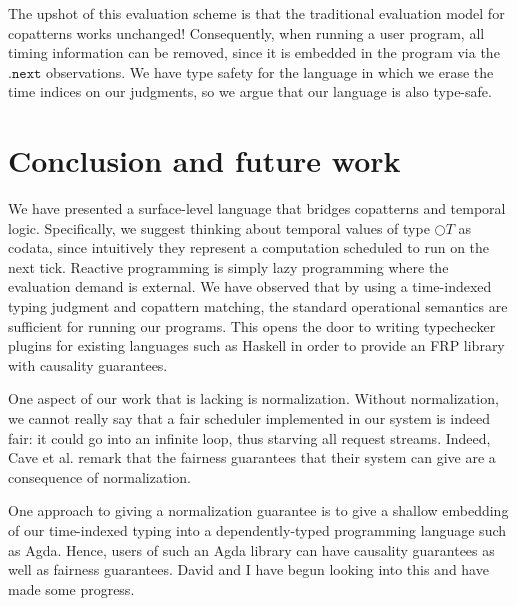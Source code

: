\documentclass[acmsmall, natbib=false]{acmart}
\renewcommand{\circle}{\bigcirc}
\renewcommand{\next}{\mathtt{.next}}
\begin{document}
The upshot of this evaluation scheme is that the traditional evaluation model
for copatterns works unchanged! Consequently, when running a user program, all
timing information can be removed, since it is embedded in the program via the
$\next$ observations. We have type safety for the language in which we erase
the time indices on our judgments, so we argue that our language is also
type-safe.

\section{Conclusion and future work}

We have presented a surface-level language that bridges copatterns and temporal
logic.
Specifically, we suggest thinking about temporal values of type $\circle T$ as
codata, since intuitively they represent a computation scheduled to run on the
next tick.
Reactive programming is simply lazy programming where the evaluation demand is
external.
We have observed that by using a time-indexed typing judgment and copattern
matching, the standard operational semantics are sufficient for running our
programs.
This opens the door to writing typechecker plugins for existing languages such
as Haskell in order to provide an FRP library with causality guarantees.

One aspect of our work that is lacking is normalization. Without normalization,
we cannot really say that a fair scheduler implemented in our system is indeed
fair: it could go into an infinite loop, thus starving all request streams.
Indeed, Cave et al.\cite{ltl} remark that the fairness guarantees that their
system can give are a consequence of normalization.

One approach to giving a normalization guarantee is to give a shallow embedding
of our time-indexed typing into a dependently-typed programming language such
as Agda.
Hence, users of such an Agda library can have causality guarantees as well as
fairness guarantees.
David and I have begun looking into this and have made some progress.
\end{document}
